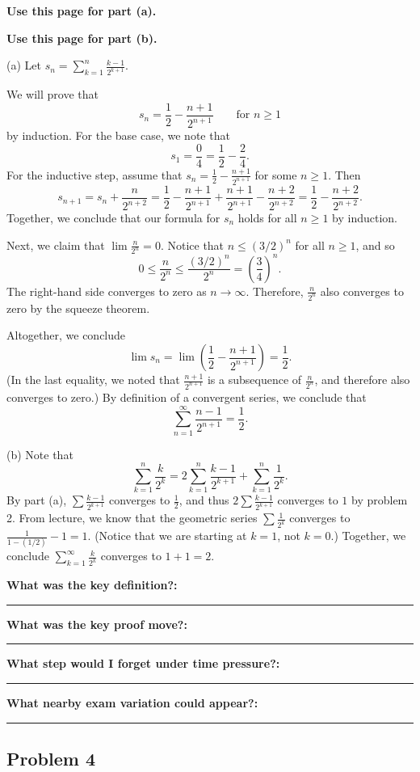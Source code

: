 \documentclass[12pt]{article}
\newcommand{\writespace}[1]{\vspace*{#1}}
\newcommand{\fillfieldbig}[2]{%
  \par\noindent\textbf{#1:}\par
  \writespace{#2}
  \noindent\rule{\linewidth}{0.35pt}\par\vspace{0.15in}%
}
\newcommand{\fullproofpage}[2]{%
  \begin{tcolorbox}[
    enhanced,
    colback=white,
    colframe=gray!60!black,
    fonttitle=\bfseries,
    title={Pass 5 -- Full Proof Attempt\hfill #1},
    height=8.45in
  ]
  \textbf{#2}

  \writespace{7.65in}
  \end{tcolorbox}
}
\newenvironment{solutionbox}[1]{%
  \begin{tcolorbox}[
    enhanced,
    breakable,
    colback=solgreen,
    colframe=green!45!black,
    fonttitle=\bfseries,
    title={#1}
  ]
}{%
  \end{tcolorbox}
}
\newcommand{\reflectionpage}[1]{%
  \begin{tcolorbox}[
    enhanced,
    colback=reflectcyan,
    colframe=cyan!55!black,
    fonttitle=\bfseries,
    title={Reflection \& Variation\hfill #1},
    height=8.45in
  ]
  \fillfieldbig{What was the key definition?}{1.15in}
  \fillfieldbig{What was the key proof move?}{1.15in}
  \fillfieldbig{What step would I forget under time pressure?}{1.15in}
  \fillfieldbig{What nearby exam variation could appear?}{1.35in}
  \end{tcolorbox}
}
\begin{document}
\newpage
\fullproofpage{Homework 6, Problem 3}{Use this page for part (a).}

\newpage
\fullproofpage{Homework 6, Problem 3}{Use this page for part (b).}

\newpage
\begin{solutionbox}{Official Solution (Professor)}
(a) Let \(s_n=\sum_{k=1}^n\frac{k-1}{2^{k+1}}\).

We will prove that
\[
  s_n=\frac12-\frac{n+1}{2^{n+1}}
  \qquad \text{for } n\ge1
\]
by induction. For the base case, we note that
\[
  s_1=\frac04=\frac12-\frac24.
\]
For the inductive step, assume that \(s_n=\frac12-\frac{n+1}{2^{n+1}}\) for some \(n\ge1\). Then
\[
  s_{n+1}
  =
  s_n+\frac{n}{2^{n+2}}
  =
  \frac12-\frac{n+1}{2^{n+1}}+\frac{n+1}{2^{n+1}}-\frac{n+2}{2^{n+2}}
  =
  \frac12-\frac{n+2}{2^{n+2}}.
\]
Together, we conclude that our formula for \(s_n\) holds for all \(n\ge1\) by induction.

Next, we claim that \(\lim\frac{n}{2^n}=0\). Notice that \(n\le(3/2)^n\) for all \(n\ge1\), and so
\[
  0\le \frac{n}{2^n}\le \frac{(3/2)^n}{2^n}=\left(\frac34\right)^n.
\]
The right-hand side converges to zero as \(n\to\infty\). Therefore, \(\frac{n}{2^n}\) also converges to zero by the squeeze theorem.

Altogether, we conclude
\[
  \lim s_n
  =
  \lim\left(\frac12-\frac{n+1}{2^{n+1}}\right)
  =
  \frac12.
\]
(In the last equality, we noted that \(\frac{n+1}{2^{n+1}}\) is a subsequence of \(\frac{n}{2^n}\), and therefore also converges to zero.) By definition of a convergent series, we conclude that
\[
  \sum_{n=1}^{\infty}\frac{n-1}{2^{n+1}}=\frac12.
\]

(b) Note that
\[
  \sum_{k=1}^n\frac{k}{2^k}
  =
  2\sum_{k=1}^n\frac{k-1}{2^{k+1}}
  +
  \sum_{k=1}^n\frac1{2^k}.
\]
By part (a), \(\sum\frac{k-1}{2^{k+1}}\) converges to \(\frac12\), and thus \(2\sum\frac{k-1}{2^{k+1}}\) converges to \(1\) by problem 2. From lecture, we know that the geometric series \(\sum\frac1{2^k}\) converges to \(\frac1{1-(1/2)}-1=1\). (Notice that we are starting at \(k=1\), not \(k=0\).) Together, we conclude \(\sum_{k=1}^{\infty}\frac{k}{2^k}\) converges to \(1+1=2\).
\end{solutionbox}

\newpage
\reflectionpage{Homework 6, Problem 3}

\newpage
\subsection{Problem 4}
\end{document}
